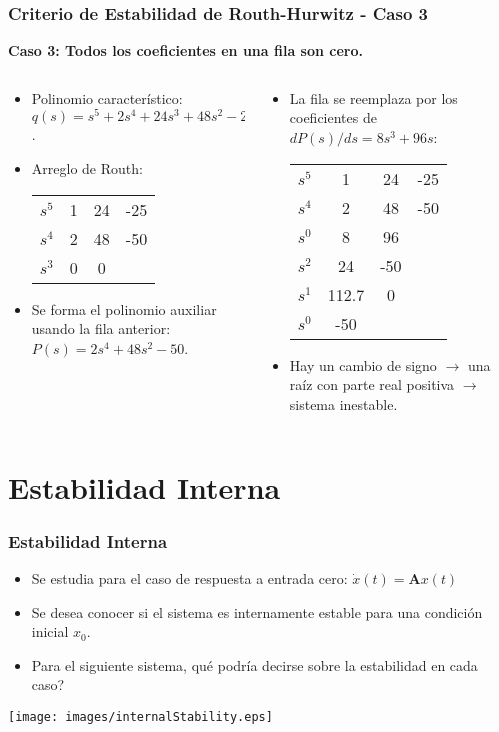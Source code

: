 \documentclass[aspectratio=169]{beamer}
\theoremstyle{definition}
\theoremstyle{plain}
\theoremstyle{remark}
\begin{document}
\begin{frame}[<+->]\frametitle{Criterio de Estabilidad de Routh-Hurwitz - Caso 3}
\textbf{Caso 3: Todos los coeficientes en una fila son cero.}
\begin{columns}
\begin{column}{0.5\textwidth}
	\begin{itemize}
		\item Polinomio característico: $q(s) = s^5 + 2s^4 + 24s^3 + 48s^2 - 25s - 50 = 0$.
		\item Arreglo de Routh:\\
		\centering	
		\begin{tabular}{c|ccc}
			$s^5$ & 1 & 24 & -25\\
			$s^4$ & 2 & 48 & -50\\
			$s^3$ & 0 & 0  & 
		\end{tabular}
		\item Se forma el polinomio auxiliar usando la fila anterior: $P(s) = 2s^4 + 48s^2 - 50$.
	\end{itemize}	
\end{column}	
\begin{column}{0.5\textwidth}
	\begin{itemize}
		\item La fila se reemplaza por los coeficientes de $dP(s)/ds = 8s^3 + 96s$:
		\centering	
		\begin{tabular}{c|ccc}
			$s^5$ & 1  &  24 & -25\\
			$s^4$ & 2  &  48 & -50\\
			$s^0$ & 8  &  96 & \\
			$s^2$ & 24 & -50 & \\
			$s^1$ & 112.7 & 0 & \\
			$s^0$ & -50 &  & 
		\end{tabular}
		\item Hay un cambio de signo $\rightarrow$ una raíz con parte real positiva $\rightarrow$ sistema inestable.
	\end{itemize}
\end{column}	
\end{columns}
\end{frame}

\section{Estabilidad Interna}
\begin{frame}[<+->]\frametitle{Estabilidad Interna}
\begin{itemize}
  \item Se estudia para el caso de respuesta a entrada cero: $\dot{x}(t) = \mathbf{A}x(t)$
  \item Se desea conocer si el sistema es internamente estable para una condición inicial $x_0$.
  \item Para el siguiente sistema, qué podría decirse sobre la estabilidad en cada caso?
\end{itemize}
	\centering
	\texttt{[image: images/internalStability.eps]}
\end{frame}
\end{document}
